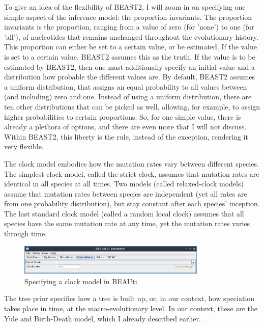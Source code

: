 To give an idea of the flexibility of BEAST2, I will zoom in on specifying
one simple aspect of the inference model: the proportion invariants.
The proportion invariants is the proportion, ranging from a value of zero (for 'none') 
to one (for 'all'), of nucleotides that remains unchanged throughout
the evolutionary history. This proportion can either be set to a certain 
value, or be estimated. If the value is set to a certain value, BEAST2 assumes
this as the truth. If the value is to be estimated by BEAST2, then
one must additionally specify an initial value and 
a distribution how probable the different values are. 
By default, BEAST2 assumes a uniform distribution,
that assigns an equal probability to all values between (and including)
zero and one. Instead of using a uniform distribution, 
there are ten other distributions that can be picked as well, allowing, for
example, to assign higher probabilities to certain proportions. 
So, for one simple value, there is already
a plethora of options, and there are even more that I will not discuss. 
Within BEAST2, this liberty is the rule, instead of the
exception, rendering it very flexible.

The clock model embodies how the mutation rates vary between
different species. The simplest clock model, called the strict clock,
assumes that mutation rates are identical in all species at all times. 
Two models (called relaxed-clock models) assume that mutation rates
between species are independent (yet all rates are from one probability 
distribution), but stay constant after each species' inception.
The last standard clock model (called a random local clock) assumes 
that all species have the same mutation
rate at any time, yet the mutation rates varies through time.

\begin{figure}[H]
  \includegraphics[width=0.8\textwidth]{beauti_clock_model.png}
  \caption{
    Specifying a clock model in BEAUti
 }
  \label{fig:beauti_clock_model}
\end{figure}

The tree prior specifies how a tree is built up, or, in our context,
how speciation takes place in time, at the macro-evolutionary level.
In our context, these are the Yule and Birth-Death model, which I already
described earlier.

